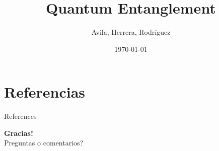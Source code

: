 \documentclass[aspectratio=169,sn-mathphys-num]{beamer}
\title{Quantum Entanglement}
\subtitle{}
\author{Avila, Herrera, Rodríguez}
\institute{Universidad Distrital Francisco José de Caldas}
\date{\today}
\begin{document}
\begin{frame}
	\titlepage
\end{frame}

\section{Referencias}
\begin{frame}[allowframebreaks]{References}
	\printbibliography
	\nocite{*}
\end{frame}

\begin{frame}[plain]
	\centering
	\vspace{1cm}
	{\Huge \textbf{Gracias!}}\\[1cm]
	{\large Preguntas o comentarios?}
\end{frame}
\end{document}
